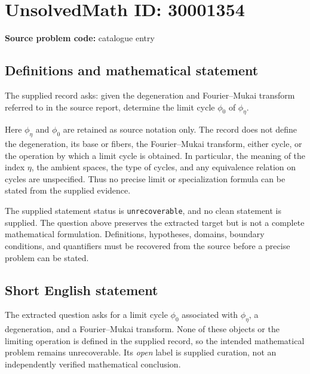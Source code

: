 \documentclass[11pt]{article}
\begin{document}
\section*{UnsolvedMath ID: 30001354}
\textbf{Source problem code:} catalogue entry
\subsection{Definitions and mathematical statement}
The supplied record asks: given the degeneration and Fourier--Mukai transform referred to in the source report, determine the limit cycle \(\phi_0\) of \(\phi_\eta\).

Here \(\phi_\eta\) and \(\phi_0\) are retained as source notation only. The record does not define the degeneration, its base or fibers, the Fourier--Mukai transform, either cycle, or the operation by which a limit cycle is obtained. In particular, the meaning of the index \(\eta\), the ambient spaces, the type of cycles, and any equivalence relation on cycles are unspecified. Thus no precise limit or specialization formula can be stated from the supplied evidence.

The supplied statement status is \texttt{unrecoverable}, and no clean statement is supplied. The question above preserves the extracted target but is not a complete mathematical formulation. Definitions, hypotheses, domains, boundary conditions, and quantifiers must be recovered from the source before a precise problem can be stated.
\subsection{Short English statement}
The extracted question asks for a limit cycle \(\phi_0\) associated with \(\phi_\eta\), a degeneration, and a Fourier--Mukai transform. None of these objects or the limiting operation is defined in the supplied record, so the intended mathematical problem remains unrecoverable. Its \emph{open} label is supplied curation, not an independently verified mathematical conclusion.
\end{document}
